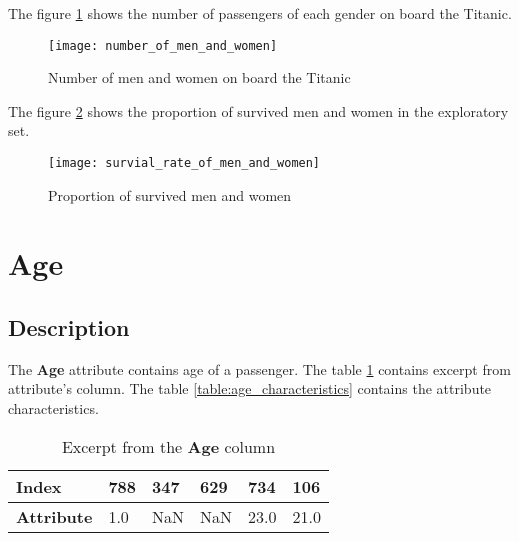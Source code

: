 The figure \ref{pic:number_of_men_and_women} shows the number of passengers 
of each gender on board the Titanic. 

\begin{figure}
    \centering
    \texttt{[image: number\_of\_men\_and\_women]}
    \caption{Number of men and women on board the Titanic}
    \label{pic:number_of_men_and_women}
\end{figure}

The figure \ref{pic:survial_rate_of_men_and_women} shows the proportion 
of survived men and women in the exploratory set.

\begin{figure}
    \centering
    \texttt{[image: survial\_rate\_of\_men\_and\_women]}
    \caption{Proportion of survived men and women}
    \label{pic:survial_rate_of_men_and_women}
\end{figure}


\section{Age} \label{section:Age}
\subsection{Description}
The \textbf{Age} attribute contains age of a passenger. The table 
\ref{table:age_head} contains excerpt from attribute's column. The table
\ref{table:age_characteristics} contains the attribute characteristics.

\begin{table}[!hp]
    \centering
    \caption{Excerpt from the \textbf{Age} column}
    \begin{tabular}{|l|l|l|l|l|l|}
        \hline
        \textbf{Index}     & 788 & 347 & 629 & 734  & 106  \\ \hline
        \textbf{Attribute} & 1.0 & NaN & NaN & 23.0 & 21.0 \\ \hline
    \end{tabular}
    \label{table:age_head}
\end{table}

